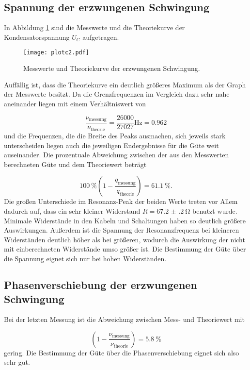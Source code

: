 \subsection{Spannung der erzwungenen Schwingung}

In Abbildung \ref{fig:Theo} sind die Messwerte und die Theoriekurve der
Kondensatorspannung $U_C$ aufgetragen.

\newpage

\begin{figure}[h]
  \centering
  \texttt{[image: plotc2.pdf]}
  \caption{Messwerte und Theoriekurve der erzwungenen Schwingung.}
  \label{fig:Theo}
\end{figure}

Auffällig ist, dass die Theoriekurve ein deutlich größeres Maximum als der
Graph der Messwerte besitzt. Da die Grenzfrequenzen im Vergleich dazu
sehr nahe aneinander liegen mit einem Verhältniswert von

\begin{equation}
  \frac{\nu_\text{messung}}{\nu_\text{theorie}} = \frac{26000}{27027}\si{\hertz}
  = 0.962
\end{equation}
und die Frequenzen, die die Breite des Peaks ausmachen, sich jeweils
stark unterscheiden liegen auch die jeweiligen Endergebnisse für die Güte
weit auseinander.
Die prozentuale Abweichung zwischen der aus den Messwerten berechneten Güte
und dem Theoriewert beträgt

\begin{equation}
  \SI{100}{\percent} (1 - \frac{q_\text{messung}}{q_\text{theorie}}) =
  \SI{61.1}{\percent}.
\end{equation}
Die großen Unterschiede im Resonanz-Peak der beiden Werte treten vor Allem
dadurch auf, dass ein sehr kleiner Widerstand $R = \SI{67.2(2)}{\ohm}$
benutzt wurde. Minimale Widerstände in den Kabeln und Schaltungen
haben so deutlich größere Auswirkungen.
Außerdem ist die Spannung der Resonanzfrequenz bei kleineren Widerständen
deutlich höher als bei größeren, wodurch die Auswirkung der nicht mit
einberechneten Widerstände umso größer ist.
Die Bestimmung der Güte über die Spannung eignet sich nur bei hohen
Widerständen.

\subsection{Phasenverschiebung der erzwungenen Schwingung}

Bei der letzten Messung ist die Abweichung zwischen Mess- und Theoriewert
mit

\begin{equation}
  (1-\frac{\nu_\text{messung}}{\nu_\text{theorie}}) =
  \SI{5.8}{\percent}
\end{equation}
gering.
Die Bestimmung der Güte über die Phasenverschiebung eignet sich also sehr gut.

